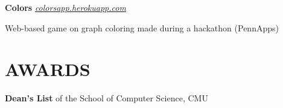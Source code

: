 \documentclass[margin, 11pt]{res} %
\begin{document}
\begin{resume}
\vspace{3pt}

{\bf Colors} \href{colorsapp.herokuapp.com}{\sl colorsapp.herokuapp.com} 
\begin{itemize} \itemsep -2pt
{\small \item Web-based game on graph coloring made during a hackathon (PennApps)}
\end{itemize}




\section{AWARDS} 

{\bf Dean's List} of the School of Computer Science, CMU



\end{resume}
\end{document}

